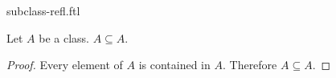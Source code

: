 \documentclass{stex}
\begin{document}
\begin{smodule}{subclass-refl.ftl}

  \begin{forthel}
    \begin{proposition}
      Let $A$ be a class.
      $A \subseteq A$.
    \end{proposition}
    \begin{proof}
      Every element of $A$ is contained in $A$.
      Therefore $A \subseteq A$.
    \end{proof}
  \end{forthel}
\end{smodule}
\end{document}
